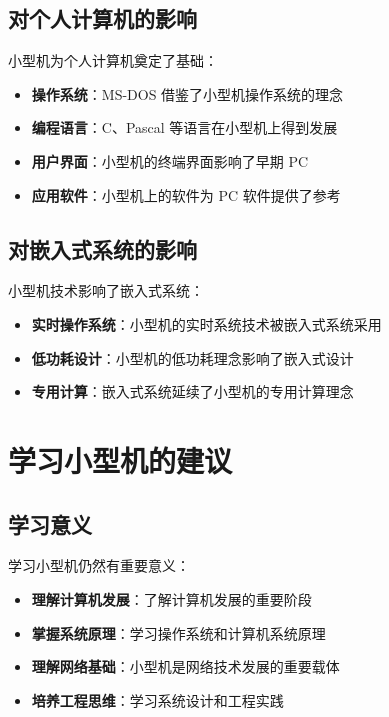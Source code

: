 \documentclass[12pt,UTF8]{ctexbook}
\begin{document}
\section{对个人计算机的影响}

小型机为个人计算机奠定了基础：

\begin{itemize}[leftmargin=2cm]
    \item \textbf{操作系统}：MS-DOS 借鉴了小型机操作系统的理念
    \item \textbf{编程语言}：C、Pascal 等语言在小型机上得到发展
    \item \textbf{用户界面}：小型机的终端界面影响了早期 PC
    \item \textbf{应用软件}：小型机上的软件为 PC 软件提供了参考
\end{itemize}

\section{对嵌入式系统的影响}

小型机技术影响了嵌入式系统：

\begin{itemize}[leftmargin=2cm]
    \item \textbf{实时操作系统}：小型机的实时系统技术被嵌入式系统采用
    \item \textbf{低功耗设计}：小型机的低功耗理念影响了嵌入式设计
    \item \textbf{专用计算}：嵌入式系统延续了小型机的专用计算理念
\end{itemize}

\chapter{学习小型机的建议}
\label{chap:learning}

\section{学习意义}

学习小型机仍然有重要意义：

\begin{itemize}[leftmargin=2cm]
    \item \textbf{理解计算机发展}：了解计算机发展的重要阶段
    \item \textbf{掌握系统原理}：学习操作系统和计算机系统原理
    \item \textbf{理解网络基础}：小型机是网络技术发展的重要载体
    \item \textbf{培养工程思维}：学习系统设计和工程实践
\end{itemize}
\end{document}
